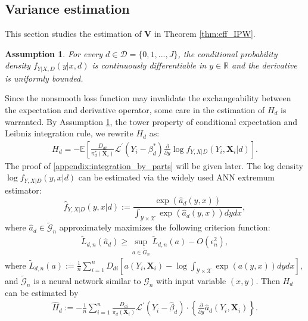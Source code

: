 \documentclass[11pt]{article}
\newtheorem{assumption}[]{Assumption}
\numberwithin{equation}{section}
\begin{document}
\subsection{Variance estimation}\label{app:variance}
This section studies the estimation of $\boldsymbol{V}$ in Theorem \ref{thm:eff_IPW}.
\begin{assumption}\label{as:density_smooth}    For every $d\in\mathcal{D}=\{0,1,...,J\}$,
	the conditional probability density  $f_{Y|X,D}(y|x,d)$  is continuously differentiable in $y\in \mathbb{R}$ and the derivative is uniformly bounded.
\end{assumption}
Since the nonsmooth loss function may invalidate the
exchangeability between the expectation and derivative operator, some care
in the estimation of $H_{d}$ is warranted. By Assumption \ref{as:density_smooth}, the tower property of
conditional expectation and Leibniz integration rule, we rewrite $H_{d}$ as:
\begin{align}\label{appendix:integration_by_parts}
	H_{d}= -\mathbb{E}\left[\frac{D_{di}}{\pi_d^*(\boldsymbol{X}_{i})} \mathcal{L}^{\prime }(Y_i-\beta_d^*) \frac{\partial }{\partial y}\log f_{Y,X|D}(Y_i,\boldsymbol{X}_{i}|d) \right] .
\end{align}
The proof of \eqref{appendix:integration_by_parts} will be given later. The log density $\log f_{Y,X|D}(y,x|d)$ can be estimated via the widely used ANN extremum estimator:
\begin{equation*}
	\widehat{f}_{Y,X|D}(y,x|d):=\frac{\exp \left( \widehat{a}_d(y,x)\right) }{\int_{\mathcal{Y}%
			\times  \mathcal{X}}\exp \left(\widehat{a}_d (y,x)\right) dydx},
\end{equation*}%
where $\widehat{a}_d \in \widetilde{\mathcal{G}}_n$
approximately maximizes the following criterion function:
\begin{align*}
	\widetilde{L}_{d,n}\left(\widehat{a}_d\right)\geq \sup_{a\in\widetilde{G}_n}\widetilde{L}_{d,n}\left(a\right)-O(\epsilon_n^2),
\end{align*}
where
$\widetilde{L}_{d,n}(a):=\frac{1}{n}\sum_{i=1}^{n}D_{di}\left[ a(Y_{i},\boldsymbol{X}_{i})-\log \int_{
	\mathcal{Y}\times \mathcal{X}}\exp \left( a(y,x)\right) dydx\right],$
and $\widetilde{\mathcal{G}}_n$ is a neural network similar to $\mathcal{G}_n$ with input variable $(x,y)$. Then $H_{d}$ can be estimated by
\begin{align}\label{def:Hdhat}
	\widehat{H}_d:=-\frac{1}{n}\sum_{i=1}^{n}\frac{D_{di}}{\widehat{\pi}_d(\boldsymbol{X}_{i})}\mathcal{L}^{\prime }(Y_{i}-\widehat{\beta}_d)\cdot \left\{\frac{\partial }{\partial y} \widehat{a}
	_{d}(Y_{i},
	\boldsymbol{X}_{i})\right\}.
\end{align}
\end{document}

